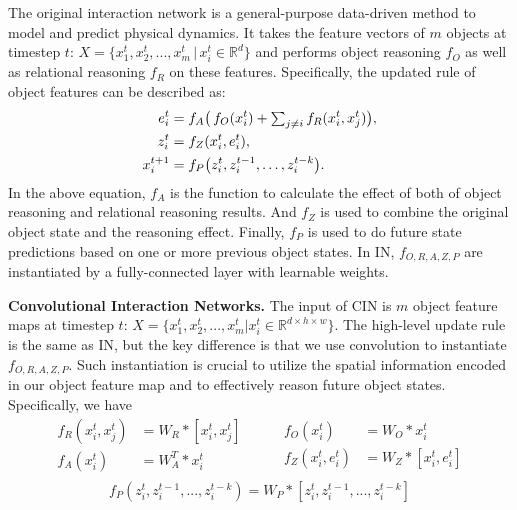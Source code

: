 \documentclass{article} \usepackage{iclr2021_conference,times}
\newcommand{\numobj}{m}
\begin{document}
The original interaction network is a general-purpose data-driven method to model and predict physical dynamics. It takes the feature vectors of $m$ objects at timestep $t$: $X= \{x_1^t, x_2^t,...,x_m^t \,|\, x_i^t \in \mathbb{R}^{d} \}$ and performs object reasoning $f_{O}$ as well as relational reasoning $f_{R}$ on these features. Specifically, the updated rule of object features can be described as:
\begin{align}
\begin{split}
e_i^t &= f_{A}\big(\, f_{O}(x_i^t) + \mathsmaller \sum_{j \neq i} \, f_{R} (x_i^t, x_j^t) \big), \\
z_i^t &= f_{Z}(x_i^t, e_i^t), \\
x_i^{t+1} &= f_{P}\big(z_i^{t}, z_i^{t-1}, \ldots, z_i^{t-k}\big).
\end{split}
\label{eq:IN}
\end{align}
In the above equation, $f_A$ is the function to calculate the effect of both of object reasoning and relational reasoning results. And $f_Z$ is used to combine the original object state and the reasoning effect. Finally, $f_P$ is used to do future state predictions based on one or more previous object states. In IN, $f_{O,R,A,Z,P}$ are instantiated by a fully-connected layer with learnable weights.

\textbf{Convolutional Interaction Networks.} 
The input of CIN is $\numobj$ object feature maps at timestep $t$: $X= \{x_1^t, x_2^t,...,x_m^t | x_{i}^{t} \in \mathbb{R}^{d \times h \times w}\}$. The high-level update rule is the same as IN, but the key difference is that we use convolution to instantiate $f_{O, R, A, Z, P}$. Such instantiation is crucial to utilize the spatial information encoded in our object feature map and to effectively reason future object states. Specifically, we have
\begin{equation}
  \begin{split}
    f_R (x_i^t, x_j^t) &= W_{R} * [x_i^t, x_j^t] \\
    f_A (x_i^t) &= W_{A}^{T} * x_i^t \\
  \end{split}
  \;\;\;\;\;\;\;\;
  \begin{split}
    f_O (x_i^t) &= W_{O} * x_i^t \\
    f_Z (x_i^t, e_i^t) &= W_{Z} * [x_i^t, e_i^t] \\
  \end{split}
\end{equation}
\vspace{-0.39em}
\begin{equation}
f_P (z_i^t, z_i^{t-1},...,z_i^{t-k}) = W_{P} * [z_i^t, z_i^{t-1},...,z_i^{t-k}]
\end{equation}
\end{document}
